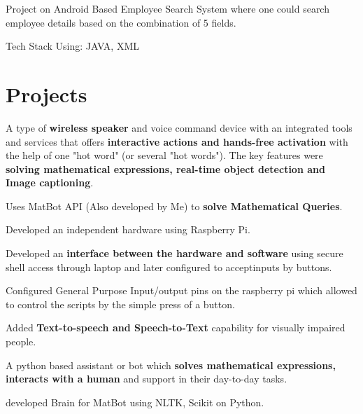 \documentclass[a4paper]{deedy-resume-openfont}
\begin{document}
\begin{minipage}[t]{0.66\textwidth}

\begin{tightemize}
 \item Project on Android Based Employee Search System where one could search employee details based on the combination of 5 fields.
 \item Tech Stack Using: JAVA, XML
\end{tightemize}
\sectionsep


\section{Projects}
 A type of \textbf{wireless speaker} and voice command device with an integrated tools and services that offers \textbf{interactive actions and hands-free activation} with the help of one "hot word" (or several "hot words"). The key features were \textbf{solving mathematical expressions, real-time object detection and Image captioning}.
\begin{tightemize}
 \item Uses MatBot API (Also developed by Me) to \textbf{solve Mathematical Queries}.
 \item Developed an independent hardware using Raspberry Pi.
 \item Developed an\textbf{ interface between the hardware and software} using secure shell access through laptop and later configured to acceptinputs by buttons.
 \item Configured General Purpose Input/output pins on the raspberry pi which allowed to control the scripts by the simple press of a button.
 \item Added \textbf{Text-to-speech and Speech-to-Text} capability for visually impaired people.
\end{tightemize}
\sectionsep
%
A python based assistant or bot which \textbf{solves mathematical expressions, interacts with a human} and support in their day-to-day tasks.
\begin{tightemize}
 \item developed Brain for MatBot using NLTK, Scikit on Python.

\end{tightemize}
\end{minipage}
\end{document}
